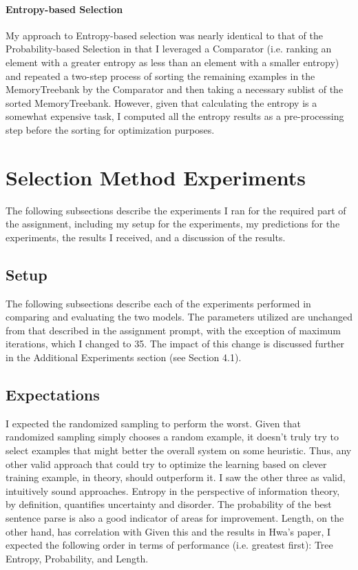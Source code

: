 \documentclass{article} %
\begin{document}
\paragraph{Entropy-based Selection}

My approach to Entropy-based selection was nearly identical to that of the Probability-based Selection in that I leveraged a Comparator (i.e. ranking an element with a greater entropy as less than an element with a smaller entropy) and repeated a two-step process of sorting the remaining examples in the MemoryTreebank by the Comparator and then taking a necessary sublist of the sorted MemoryTreebank. However, given that calculating the entropy is a somewhat expensive task, I computed all the entropy results as a pre-processing step before the sorting for optimization purposes.

\section{Selection Method Experiments}

The following subsections describe the experiments I ran for the required part of the assignment, including my setup for the experiments, my predictions for the experiments, the results I received, and a discussion of the results.

\subsection{Setup}

The following subsections describe each of the experiments performed in comparing and evaluating the two models. The parameters utilized are unchanged from that described in the assignment prompt, with the exception of maximum iterations, which I changed to 35. The impact of this change is discussed further in the Additional Experiments section (see Section 4.1). 

\subsection{Expectations}

I expected the randomized sampling to perform the worst. Given that randomized sampling simply chooses a random example, it doesn't truly try to select examples that might better the overall system on some heuristic. Thus, any other valid approach that could try to optimize the learning based on clever training example, in theory, should outperform it. I saw the other three as valid, intuitively sound approaches. Entropy in the perspective of information theory, by definition, quantifies uncertainty and disorder. The probability of the best sentence parse is also a good indicator of areas for improvement. Length, on the other hand, has correlation with  Given this and the results in Hwa's paper, I expected the following order in terms of performance (i.e. greatest first): Tree Entropy, Probability, and Length. 
\end{document}
